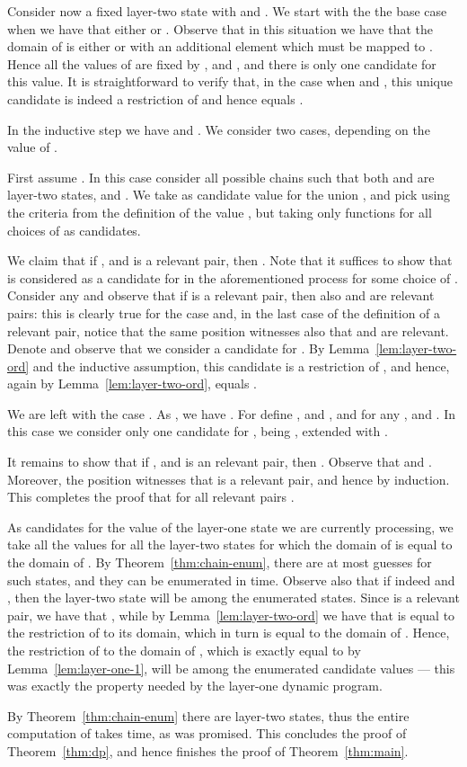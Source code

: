 Consider now a fixed layer-two state  with
 and .
We start with the the base case when we have that either  or
. Observe that in this situation we have that the domain of  is either  or  with an additional element  which must be mapped to . Hence all the values of  are fixed by ,  and , and there is only one candidate for this value.
It is straightforward to verify that, in the case when  and , this
unique candidate is indeed a restriction of  and hence equals .

In the inductive step we have  and .
We consider two cases, depending on the value of .

First assume .
In this case consider all possible chains  such that both  and  are layer-two states,
and .
We take as candidate value for  the union , and pick  using the criteria
from the definition of the value , but taking only functions  for all choices of  as candidates.

We claim that if ,  and  is a relevant pair, then 
. Note that it suffices to show that  is considered as a candidate for 
in the aforementioned process for some choice of .
Consider any  and observe that if  is a relevant pair,
then also  and  are relevant pairs: this is clearly true for
the case  and, in the last case of the definition of a relevant pair,
notice that the same position  witnesses also that  and  are relevant.
Denote  and observe that we consider a candidate  for .
By Lemma~\ref{lem:layer-two-ord} and the inductive assumption, this candidate is a restriction of , and hence,
again by Lemma~\ref{lem:layer-two-ord}, equals .

We are left with the case . As , we have .
For  define , and
,  and 
for any , and .
In this case we consider only one candidate for , being , extended with 
.

It remains to show that if ,  and  is an relevant pair,
then .
Observe that  and .
Moreover, the position  witnesses that  is a relevant pair, and hence
 by induction.
This completes the proof that  for all relevant pairs .

As candidates for the value  of the layer-one state  we are currently processing, we take all the values  for all the layer-two states  for which the domain of  is equal to the domain of . By Theorem~\ref{thm:chain-enum}, there are at most  guesses for such states, and they can be enumerated in  time. Observe also that if indeed  and , then the layer-two state  will be among the enumerated states. Since  is a relevant pair, we have that , while by Lemma~\ref{lem:layer-two-ord} we have that  is equal to the restriction of  to its domain, which in turn is equal to the domain of . Hence, the restriction of  to the domain of , which is exactly equal to  by Lemma~\ref{lem:layer-one-1}, will be among the enumerated candidate values --- this was exactly the property needed by the layer-one dynamic program.


By Theorem~\ref{thm:chain-enum} there are  layer-two states, thus the entire computation of 
takes  time, as was promised.
This concludes the proof of Theorem~\ref{thm:dp}, and hence finishes the proof of Theorem~\ref{thm:main}.

